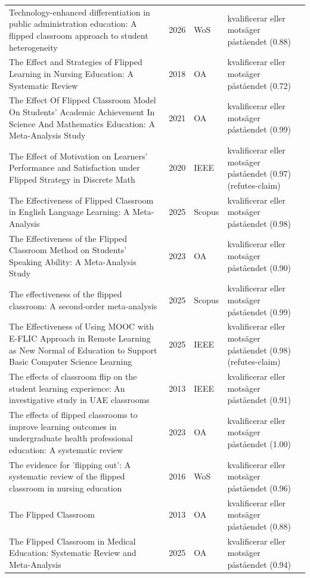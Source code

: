 \begin{longtable}{@{}%
  >{\raggedright\arraybackslash}p{}c%
  >{\raggedright\arraybackslash}p{}%
  >{\raggedright\arraybackslash}p{}@{}}
Technology-enhanced differentiation in public administration education: A flipped classroom approach to student heterogeneity & 2026 & WoS & kvalificerar eller motsäger påståendet (0.88) \\
The Effect and Strategies of Flipped Learning in Nursing Education: A Systematic Review & 2018 & OA & kvalificerar eller motsäger påståendet (0.72) \\
The Effect Of Flipped Classroom Model On Students' Academic Achievement In Science And Mathematics Education: A Meta-Analysis Study & 2021 & OA & kvalificerar eller motsäger påståendet (0.99) \\
The Effect of Motivation on Learners' Performance and Satisfaction under Flipped Strategy in Discrete Math & 2020 & IEEE & kvalificerar eller motsäger påståendet (0.97) (refutes-claim) \\
The Effectiveness of Flipped Classroom in English Language Learning: A Meta-Analysis & 2025 & Scopus & kvalificerar eller motsäger påståendet (0.98) \\
The Effectiveness of the Flipped Classroom Method on Students' Speaking Ability: A Meta-Analysis Study & 2023 & OA & kvalificerar eller motsäger påståendet (0.90) \\
The effectiveness of the flipped classroom: A second-order meta-analysis & 2025 & Scopus & kvalificerar eller motsäger påståendet (0.99) \\
The Effectiveness of Using MOOC with E-FLIC Approach in Remote Learning as New Normal of Education to Support Basic Computer Science Learning & 2025 & IEEE & kvalificerar eller motsäger påståendet (0.98) (refutes-claim) \\
The effects of classroom flip on the student learning experience: An investigative study in UAE classrooms & 2013 & IEEE & kvalificerar eller motsäger påståendet (0.91) \\
The effects of flipped classrooms to improve learning outcomes in undergraduate health professional education: A systematic review & 2023 & OA & kvalificerar eller motsäger påståendet (1.00) \\
The evidence for 'flipping out': A systematic review of the flipped classroom in nursing education & 2016 & WoS & kvalificerar eller motsäger påståendet (0.96) \\
The Flipped Classroom & 2013 & OA & kvalificerar eller motsäger påståendet (0.88) \\
The Flipped Classroom in Medical Education: Systematic Review and Meta-Analysis & 2025 & OA & kvalificerar eller motsäger påståendet (0.94) \\

\end{longtable}
